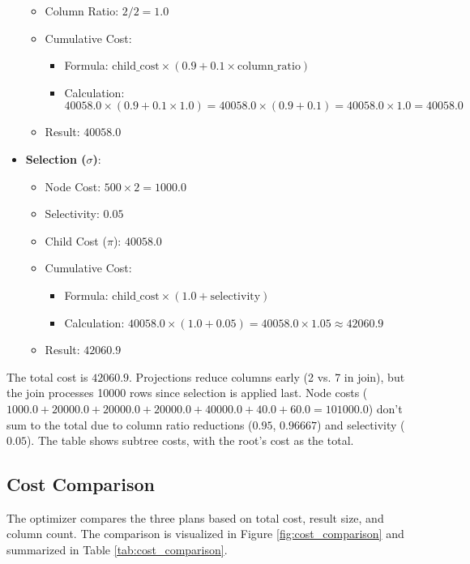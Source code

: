 \documentclass[12pt,a4paper]{article}
\begin{document}
\begin{itemize}
\begin{itemize}
            \item Column Ratio: $2 / 2 = 1.0$
            \item Cumulative Cost:
                \begin{itemize}
                    \item Formula: $\text{child\_cost} \times (0.9 + 0.1 \times \text{column\_ratio})$
                    \item Calculation: $40058.0 \times (0.9 + 0.1 \times 1.0) = 40058.0 \times (0.9 + 0.1) = 40058.0 \times 1.0 = 40058.0$
                \end{itemize}
            \item Result: $40058.0$
        \end{itemize}
    \item \textbf{Selection ($\sigma$)}:
        \begin{itemize}
            \item Node Cost: $500 \times 2 = 1000.0$
            \item Selectivity: $0.05$
            \item Child Cost ($\pi$): $40058.0$
            \item Cumulative Cost:
                \begin{itemize}
                    \item Formula: $\text{child\_cost} \times (1.0 + \text{selectivity})$
                    \item Calculation: $40058.0 \times (1.0 + 0.05) = 40058.0 \times 1.05 \approx 42060.9$
                \end{itemize}
            \item Result: $42060.9$
        \end{itemize}
\end{itemize}

The total cost is $42060.9$. Projections reduce columns early (2 vs. 7 in join), but the join processes 10000 rows since selection is applied last. Node costs ($1000.0 + 20000.0 + 20000.0 + 20000.0 + 40000.0 + 40.0 + 60.0 = 101000.0$) don’t sum to the total due to column ratio reductions ($0.95$, $0.96667$) and selectivity ($0.05$). The table shows subtree costs, with the root’s cost as the total.

\subsection{Cost Comparison}
The optimizer compares the three plans based on total cost, result size, and column count. The comparison is visualized in Figure \ref{fig:cost_comparison} and summarized in Table \ref{tab:cost_comparison}.
\end{document}
